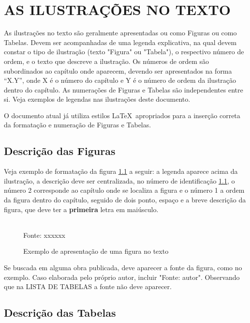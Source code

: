 \documentclass[rel_mlp]{iiufrgs}
\newcommand{\fonte}[1]{\\Fonte: {#1}}
\begin{document}
\chapter{AS ILUSTRAÇÕES NO TEXTO}

As ilustrações no texto são geralmente apresentadas ou como Figuras ou como Tabelas. Devem ser acompanhadas de uma legenda explicativa, na qual devem constar o tipo de ilustração (texto "Figura" ou "Tabela"), o respectivo número de ordem, e o texto que descreve a ilustração. Os números de ordem são subordinados ao capítulo onde aparecem, devendo ser apresentados na forma ``X.Y'', onde X é o número do capítulo e Y é o número de ordem da ilustração dentro do capítulo. As numerações de Figuras e Tabelas são independentes entre si. Veja exemplos de legendas nas ilustrações deste documento. 

O documento atual já utiliza estilos \LaTeX\ apropriados para a inserção correta da formatação e numeração de Figuras e Tabelas. 


\section{Descrição das Figuras}

Veja exemplo de formatação da figura \ref{fig:figura1} a seguir: a legenda aparece acima da ilustração, a descrição deve ser centralizada, no número de identificação  \ref{fig:figura1}, o número 2 corresponde ao capítulo onde se localiza a figura e o número 1 a ordem da figura dentro do capítulo, seguido de dois ponto, espaço e a breve descrição da figura, que deve ter a {\bf primeira} letra em maiúsculo.


\begin{figure}[htb]
    \centering
    \caption{Exemplo de apresentação de uma figura no texto}
    \label{fig:figura1}
    \fonte{xxxxxx}
\end{figure}


Se  buscada em alguma obra publicada, deve aparecer a fonte da figura, como no exemplo. Caso elaborada pelo próprio autor, incluir "Fonte: autor". Observando que na LISTA DE TABELAS a fonte não deve aparecer. 



\section{Descrição das Tabelas}
\end{document}
